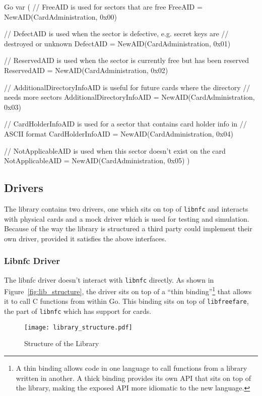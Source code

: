 \documentclass[dissertation.tex]{subfiles}
\begin{document}
  \begin{code}[numbers=none]{Go}
    var (
    	// FreeAID is used for sectors that are free
    	FreeAID = NewAID(CardAdministration, 0x00)

    	// DefectAID is used when the sector is defective, e.g. secret keys are
    	// destroyed or unknown
    	DefectAID = NewAID(CardAdministration, 0x01)

    	// ReservedAID is used when the sector is currently free but has been reserved
    	ReservedAID = NewAID(CardAdministration, 0x02)

    	// AdditionalDirectoryInfoAID is useful for future cards where the directory
    	// needs more sectors
    	AdditionalDirectoryInfoAID = NewAID(CardAdministration, 0x03)

    	// CardHolderInfoAID is used for a sector that contains card holder info in
    	// ASCII format
    	CardHolderInfoAID = NewAID(CardAdministration, 0x04)

    	// NotApplicableAID is used when this sector doesn't exist on the card
    	NotApplicableAID = NewAID(CardAdministration, 0x05)
    )
  \end{code}

  \subsection{Drivers}
  The library contains two drivers, one which sits on top of \texttt{libnfc} and interacts with physical cards and a mock driver which is used for testing and simulation. Because of the way the library is structured a third party could implement their own driver, provided it satisfies the above interfaces.

  \subsubsection{Libnfc Driver}
  The libnfc driver doesn't interact with \texttt{libnfc} directly. As shown in Figure~\vref{fig:lib_structure}, the driver sits on top of a ``thin binding''\footnote{A thin binding allows code in one language to call functions from a library written in another. A thick binding provides its own API that sits on top of the library, making the exposed API more idiomatic to the new language.} that allows it to call C functions from within Go. This binding sits on top of \texttt{libfreefare}, the part of \texttt{libnfc} which has support for \mifare{} cards.

  \begin{figure}[h]
    \centering
    \texttt{[image: library\_structure.pdf]}
    \caption{Structure of the \mifare{} Library}\label{fig:lib_structure}
  \end{figure}
\end{document}
